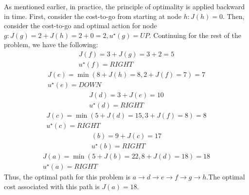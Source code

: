 \documentclass[twoside]{article}
\begin{document}
As mentioned earlier, in practice, the principle of optimality is applied backward in time. First, consider the cost-to-go from starting at node $h:J(h)=0.$ Then, consider the cost-to-go and optimal action for node $ g:J(g)=2+J(h)=2+0=2,u^{\star}(g)=UP$. Continuing for the rest of the problem, we have the following:
\begin{gather*}
J(f)=3+J(g)=3+2=5 \\
u^\star(f) = RIGHT
\end{gather*}
\begin{gather*}
J(e)=\min( 8 + J ( h ) = 8, 2 + J ( f ) = 7 ) = 7 \\
u^\star(e) = DOWN
\end{gather*}
\begin{gather*}
J(d)=3 + J ( e ) = 10 \\
u^\star(d) = RIGHT
\end{gather*}
\begin{gather*}
J(c)=\min( 5 + J ( d ) = 15, 3 + J ( f ) = 8 ) = 8\\
u^\star(c) = RIGHT
\end{gather*}
\begin{gather*}
(b)=9 + J ( c ) = 17 \\
u^\star(b) = RIGHT
\end{gather*}
\begin{gather*}
J(a)=\min ( 5 + J ( b ) = 22, 8 + J ( d ) = 18 ) = 18\\
u^\star(a) = RIGHT
\end{gather*}
Thus, the optimal path for this problem is $a \xrightarrow{} d \xrightarrow{} e \xrightarrow{} f \xrightarrow{} g \xrightarrow{} h.$The optimal cost associated with
this path is $J ( a ) = 18.$
\end{document}
